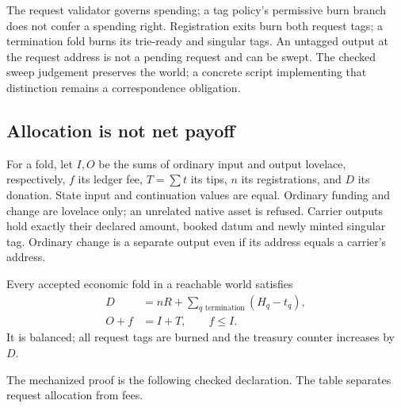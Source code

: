 The request validator governs spending; a tag policy's permissive burn branch
does not confer a spending right. Registration exits burn both request tags;
a termination fold burns its trie-ready and singular tags. An untagged output
at the request address is not a pending request and can be swept. The checked
sweep judgement preserves the world; a concrete script implementing that
distinction remains a correspondence obligation.

\subsection{Allocation is not net payoff}
\begin{definition}
For a fold, let $I,O$ be the sums of ordinary input and output lovelace,
respectively, $f$ its ledger fee, $T=\sum t$ its tips, $n$ its registrations,
and $D$ its donation. State input and continuation values are equal.
Ordinary funding and change are lovelace only; an unrelated native asset is
refused. Carrier outputs hold exactly their declared amount, booked datum and newly
minted singular tag. Ordinary change is a separate output even if its address
equals a carrier's address.
\end{definition}
\checked
\begin{theorem}
Every accepted economic fold in a reachable world satisfies
\begin{align}
D &= nR+\sum_{q\text{ termination}}(H_q-t_q),\label{eq:donation}\\
O+f &= I+T,\qquad f\le I.\label{eq:gross}
\end{align}
It is balanced; all request tags are burned and the treasury counter increases
by $D$.
\end{theorem}
The mechanized proof is the following checked declaration. The table separates
request allocation from fees.

